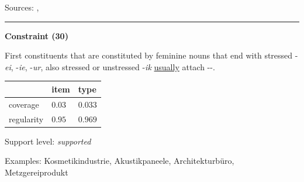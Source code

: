\noindent
Sources: \citet[110]{kuerschner_2005}, \citet[9]{schaefer_pankratz_2018}


\hrule




\vspace{0.4em}

\begin{center}
\textbf{Constraint (30)}
\end{center}

\noindent
First constituents that are constituted by feminine nouns that end with stressed -\textit{ei}, -\textit{ie}, -\textit{ur}, also stressed or unstressed -\textit{ik} \underline{usually} attach \mbox{-{\zeroLinker}-}.
\vspace{0.35em}


\vspace{-0.35em}

\begin{table}[!ht]
\begin{center}

\begin{tabularx}{\columnwidth}{|X|X|X|}
\hline
 & item & type \\
\hline
 coverage & $0.03$ & $0.033$ \\
\hline
 regularity & $0.95$ & $0.969$ \\
\hline
\end{tabularx}
\end{center}
\end{table}

\vspace{-1.35em}

\noindent
Support level: \textit{supported}

\vspace{0.3em}

\noindent
Examples: Kosmetik{\zeroLinker}industrie, Akustik{\zeroLinker}paneele, Architektur{\zeroLinker}büro, Metzgerei{\zeroLinker}produkt

